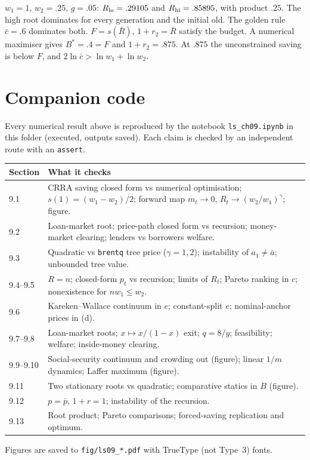 \documentclass[12pt, letterpaper]{article}
\begin{document}
\begin{tcolorbox}[oddbox,title={Exercise 9.13 \quad Bryant--Keynes--Wallace}]
\begin{tcolorbox}[databox]
$w_1=1$, $w_2=.25$, $g=.05$: $R_{\rm lo}=.29105$ and $R_{\rm hi}=.85895$, with product $.25$. The high
root dominates for every generation and the initial old. The golden rule $\bar c=.6$ dominates both.
$F=s(\bar R)$, $1+r_2=\bar R$ satisfy the budget. A numerical maximiser gives $B^*=.4=F$ and
$1+r_2=.875$. At $.875$ the unconstrained saving is below $F$, and $2\ln\bar c>\ln w_1+\ln w_2$.
\end{tcolorbox}
\end{tcolorbox}

\section*{Companion code}

Every numerical result above is reproduced by the notebook \texttt{ls\_ch09.ipynb} in this folder
(executed, outputs saved). Each claim is checked by an independent route with an \texttt{assert}.

\begin{center}
\begin{tabular}{@{}lp{11.6cm}@{}}
\toprule
\textbf{Section} & \textbf{What it checks} \\
\midrule
9.1 & CRRA saving closed form vs numerical optimisation; $s(1)=(w_1-w_2)/2$; forward map $m_t\to0$, $R_t\to(w_2/w_1)^\gamma$; figure. \\
9.2 & Loan-market root; price-path closed form vs recursion; money-market clearing; lenders vs borrowers welfare. \\
9.3 & Quadratic vs \texttt{brentq} tree price ($\gamma=1,2$); instability of $a_1\ne\bar a$; unbounded tree value. \\
9.4--9.5 & $R=n$; closed-form $p_t$ vs recursion; limits of $R_t$; Pareto ranking in $c$; nonexistence for $nw_1\le w_2$. \\
9.6 & Kareken--Wallace continuum in $e$; constant-split $e$; nominal-anchor prices in (d). \\
9.7--9.8 & Loan-market roots; $x\mapsto x/(1-x)$ exit; $q=8/y$; feasibility; welfare; inside-money clearing. \\
9.9--9.10 & Social-security continuum and crowding out (figure); linear $1/m$ dynamics; Laffer maximum (figure). \\
9.11 & Two stationary roots vs quadratic; comparative statics in $B$ (figure). \\
9.12 & $p=\bar p$, $1+r=1$; instability of the recursion. \\
9.13 & Root product; Pareto comparisons; forced-saving replication and optimum. \\
\bottomrule
\end{tabular}
\end{center}

Figures are saved to \texttt{fig/ls09\_*.pdf} with TrueType (not Type~3) fonts.
\end{document}
